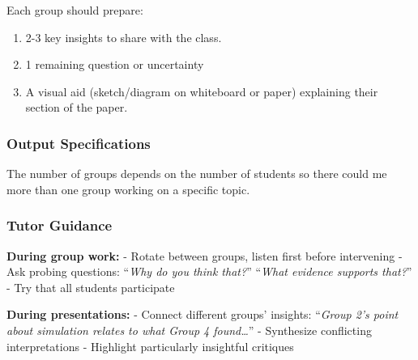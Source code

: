 \documentclass[
  letterpaper,
  DIV=11,
  numbers=noendperiod]{scrartcl}
\begin{document}
Each group should prepare:

\begin{enumerate}
\def\labelenumi{\arabic{enumi}.}
\item
  2-3 key insights to share with the class.
\item
  1 remaining question or uncertainty
\item
  A visual aid (sketch/diagram on whiteboard or paper) explaining their
  section of the paper.
\end{enumerate}

\subsubsection{\texorpdfstring{\textbf{Output
Specifications}}{Output Specifications}}\label{output-specifications}

The number of groups depends on the number of students so there could me
more than one group working on a specific topic.

\subsubsection{\texorpdfstring{\textbf{Tutor
Guidance}}{Tutor Guidance}}\label{tutor-guidance}

\textbf{During group work:} - Rotate between groups, listen first before
intervening - Ask probing questions: ``\emph{Why do you think that?}''
``\emph{What evidence supports that?}'' - Try that all students
participate

\textbf{During presentations:} - Connect different groups' insights:
``\emph{Group 2's point about simulation relates to what Group 4
found\ldots{}}'' - Synthesize conflicting interpretations - Highlight
particularly insightful critiques
\end{document}
